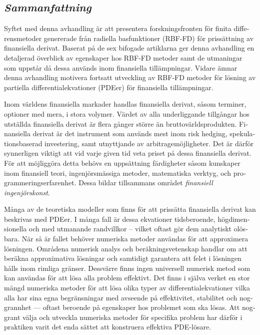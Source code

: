 \documentclass{UUThesisTemplate}
\begin{document}
 
 
 
 
 
 
 
 
 
\newpage
\begin{swedish}
\chapter{\emph{Sammanfattning}}
{\noteunic
\par
Syftet med denna avhandling är att presentera forskningsfronten för finita differensmetoder genererade från radiella basfunktioner (RBF-FD) för prissättning av finansiella derivat.
Baserat på de sex bifogade artiklarna ger denna avhandling en detaljerad överblick av egenskaper hos RBF-FD metoder samt de utmaningar som uppstår då dessa används inom finansiella tillämpningar.
Vidare ämnar denna avhandling motivera fortsatt utveckling av RBF-FD metoder för lösning av partiella differentialekvationer (PDEer) för finansiella tillämpningar.

\par
Inom världens finansiella markader handlas finansiella derivat, såsom terminer, optioner med mera, i stora volymer.
Värdet av alla underliggande tillgångar hos utställda finansiella derivat är flera gånger större än bruttovärldsprodukten.
Finansiella derivat är det instrument som används mest inom risk hedging, spekulationsbaserad investering, samt utnyttjande av arbitragemöjligheter.
Det är därför synnerligen viktigt att vid varje given tid veta priset på dessa finansiella derivat.
För att möjliggöra detta behövs en uppsättning färdigheter såsom kunskaper inom finansiell teori, ingenjörsmässiga metoder, matematiska verktyg, och programmeringserfarenhet. Dessa bildar tillsammans området \emph{finansiell ingenjörskonst}.

\par
Många av de teoretiska modeller som finns för att prissätta finansiella derivat kan beskrivas med PDEer.
I många fall är dessa ekvationer tidsberoende, högdimensionella och med utmanande randvillkor -- vilket oftast gör dem analytiskt olösbara.
När så är fallet behöver numeriska metoder användas för att approximera lösningen.
Områdena numerisk analys och beräkningsvetenskap handlar om att beräkna approximativa lösningar och samtidigt garantera att felet i lösningen hålls inom rimliga gränser.
Dessvärre finns ingen universell numerisk metod som kan användas för att lösa alla problem effektivt.
Det finns i själva verket en stor mängd numeriska metoder för att lösa olika typer av differentialekvationer vilka alla har sina egna begränsningar med avseende på effektivitet, stabilitet och noggrannhet --- oftast beroende på egenskaper hos problemet som ska lösas.
Att noggrant välja och utveckla numeriska metoder för specifika problem har därför i praktiken varit det enda sättet att konstruera effektiva PDE-lösare.

}
\end{swedish}
\end{document}
